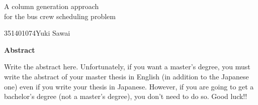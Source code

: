 

\newpage
\begin{center}{\LARGE A column generation approach \\for the bus crew scheduling problem}\\[0.5cm]
\end{center}
\hfill {\large 351401074\qquad Yuki Sawai}\\[0.5cm]
\begin{center}
{\large \bf Abstract}\\
\end{center}
Write the abstract here.
Unfortunately, if you want a master's degree, you must write the abstract of your master thesis
in English (in addition to the Japanese one) even if you write your thesis in Japanese.
However, if you are going to get a bachelor's degree (not a master's degree),
you don't need to do so.
Good luck!!
